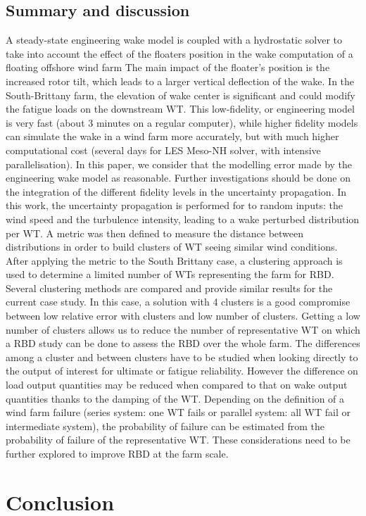 \subsection{Summary and discussion}
A steady-state engineering wake model is coupled with a hydrostatic solver to take into account the effect of the floaters position in the wake computation of a floating offshore wind farm
The main impact of the floater's position is the increased rotor tilt, which leads to a larger vertical deflection of the wake. 
In the South-Brittany farm, the elevation of wake center is significant and could modify the fatigue loads on the downstream WT. 
This low-fidelity, or engineering model is very fast (about 3 minutes on a regular computer), while higher fidelity models can simulate the wake in a wind farm more accurately, but with much higher computational cost (several days for LES Meso-NH solver, with intensive parallelisation). 
In this paper, we consider that the modelling error made by the engineering wake model as reasonable. 
Further investigations should be done on the integration of the different fidelity levels in the uncertainty propagation. 
In this work, the uncertainty propagation is performed for to random inputs: the wind speed and the turbulence intensity, leading to a wake perturbed distribution per WT. 
A metric was then defined to measure the distance between distributions in order to build clusters of WT seeing similar wind conditions. 
After applying the metric to the South Brittany case, a clustering approach is used to determine a limited number of WTs representing the farm for RBD. 
Several clustering methods are compared and provide similar results for the current case study. In this case, a solution with 4 clusters is a good compromise between low relative error with clusters and low number of clusters. 
Getting a low number of clusters allows us to reduce the number of representative WT on which a RBD study can be done to assess the RBD over the whole farm. 
The differences among a cluster and between clusters have to be studied when looking directly to the output of interest for ultimate or fatigue reliability. 
However the difference on load output quantities may be reduced when compared to that on wake output quantities thanks to the damping of the WT. 
Depending on the definition of a wind farm failure (series system: one WT fails or parallel system: all WT fail or intermediate system), the probability of failure can be estimated from the probability of failure of the representative WT. 
These considerations need to be further explored to improve RBD at the farm scale. 



\newpage
\section{Conclusion}
